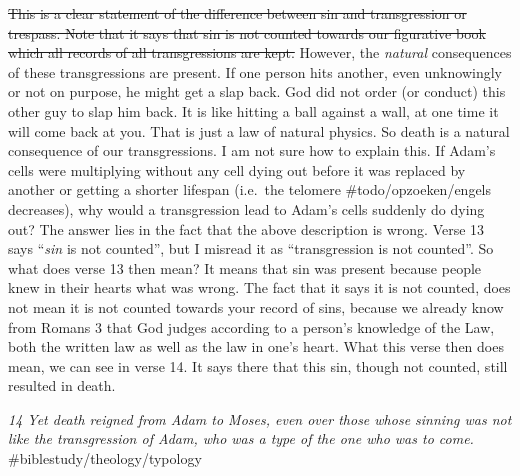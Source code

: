 \sout{This is a clear statement of the difference between sin and
transgression or trespass. Note that it says that sin is not counted
towards our figurative book which all records of all transgressions are
kept.} However, the \emph{natural} consequences of these transgressions
are present. If one person hits another, even unknowingly or not on
purpose, he might get a slap back. God did not order (or conduct) this
other guy to slap him back. It is like hitting a ball against a wall, at
one time it will come back at you. That is just a law of natural
physics. So death is a natural consequence of our transgressions. I am
not sure how to explain this. If Adam's cells were multiplying without
any cell dying out before it was replaced by another or getting a
shorter lifespan (i.e.~the telomere \#todo/opzoeken/engels decreases),
why would a transgression lead to Adam's cells suddenly do dying out?
The answer lies in the fact that the above description is wrong. Verse
13 says ``\emph{sin} is not counted'', but I misread it as
``transgression is not counted''. So what does verse 13 then mean? It
means that sin was present because people knew in their hearts what was
wrong. The fact that it says it is not counted, does not mean it is not
counted towards your record of sins, because we already know from Romans
3 that God judges according to a person's knowledge of the Law, both the
written law as well as the law in one's heart. What this verse then does
mean, we can see in verse 14. It says there that this sin, though not
counted, still resulted in death.

\emph{14 Yet death reigned from Adam to Moses, even over those whose
sinning was not like the transgression of Adam, who was a type of the
one who was to come.} \#biblestudy/theology/typology

